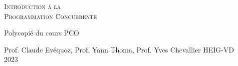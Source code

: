 \documentclass[a4paper, 11pt, onecolumn, twoside, openright]{report}
\newcounter{exercicecounter}
\newcommand{\startchapter}{\thispagestyle{myplain}
\setcounter{exercicecounter}{1}}
\begin{document}
\begin{titlepage}
  \logo{1cm}{1cm}
  \centering \vspace*{\fill}%

  {\Huge \scshape Introduction à la\\\vspace{1em}Programmation Concurrente}\par
  \vspace{5em}%
  {\Large Polycopié du cours PCO}\par
  \vspace{5em}%
  \upshape\par
  {\Large Prof. Claude Evéquoz, Prof. Yann Thoma, Prof. Yves Chevallier }%
  \vspace{2em}%
  {\Large
    HEIG-VD\\
    2023}%
  \vspace*{\fill}
\end{titlepage}

\tableofcontents








\appendix




\clearpage

\listoffigures
\listoftables
\lstlistoflistings

\let\ifFTR\iftrue\captionsfrench

\nocite{*}


\startchapter
{}

\end{document}
